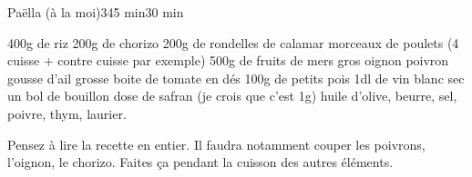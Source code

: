 \begin{recette}{Paëlla (à la moi)}{3}{45 min}{30 min}
\begin{ingredients}
\ingredient 400g de riz
\ingredient 200g de chorizo
\ingredient 200g de rondelles de calamar
 morceaux de poulets (4 cuisse + contre cuisse par exemple)
\ingredient 500g de fruits de mers
 gros oignon
 poivron
 gousse d'ail
 grosse boite de tomate en dés
\ingredient 100g de petits pois
\ingredient 1dl de vin blanc sec
\ingredient un bol de bouillon
 dose de safran (je crois que c'est 1g)
\ingredient huile d'olive, beurre, sel, poivre, thym, laurier.
\end{ingredients}

\begin{preparation*}
Pensez à lire la recette en entier. Il faudra notamment couper les poivrons, l'oignon, le chorizo. Faites ça pendant la cuisson des autres éléments.


\end{preparation*}
\end{recette}
